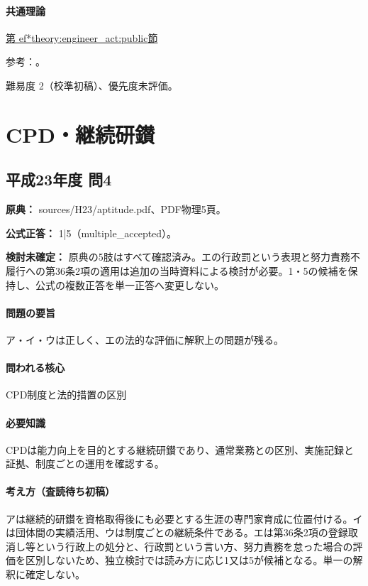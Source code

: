 \paragraph{共通理論} \hyperref[theory:engineer_act:public]{第
ef*{theory:engineer_act:public}節}

\par 参考：\cite{engineer_act_current,cpd_v3}。

\par 難易度 2（校準初稿）、優先度未評価。

\section{CPD・継続研鑚}

\subsection{平成23年度 問4}
\label{q:h23-reg-apt-04}

\noindent\textbf{原典：} sources/H23/aptitude.pdf、PDF物理5頁。

\textbf{公式正答：} 1|5（multiple\_accepted）。

\par\textbf{検討未確定：} 原典の5肢はすべて確認済み。エの行政罰という表現と努力責務不履行への第36条2項の適用は追加の当時資料による検討が必要。1・5の候補を保持し、公式の複数正答を単一正答へ変更しない。

\paragraph{問題の要旨} ア・イ・ウは正しく、エの法的な評価に解釈上の問題が残る。

\paragraph{問われる核心} CPD制度と法的措置の区別

\paragraph{必要知識} CPDは能力向上を目的とする継続研鑚であり、通常業務との区別、実施記録と証拠、制度ごとの運用を確認する。

\paragraph{考え方（査読待ち初稿）} アは継続的研鑚を資格取得後にも必要とする生涯の専門家育成に位置付ける。イは団体間の実績活用、ウは制度ごとの継続条件である。エは第36条2項の登録取消し等という行政上の処分と、行政罰という言い方、努力責務を怠った場合の評価を区別しないため、独立検討では読み方に応じ1又は5が候補となる。単一の解釈に確定しない。

